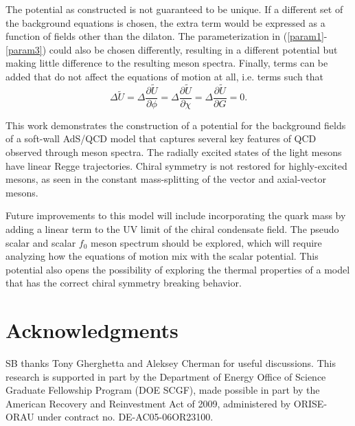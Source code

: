 \documentclass[12pt]{article}
\newcommand{\be}{\begin{equation}}
\newcommand{\ee}{\end{equation}}
\begin{document}
The potential as constructed is not guaranteed to be unique.
If a different set of the background equations is chosen, the extra term would be expressed as a function of fields other than the dilaton.
The parameterization in (\ref{param1}-\ref{param3}) could also be chosen differently, resulting in a different potential but making little difference to the resulting meson spectra.
Finally, terms can be added that do not affect the equations of motion at all, i.e. terms such that 
\be
\Delta \tilde{U} = \Delta \frac{\partial \tilde{U}}{\partial \phi} = \Delta \frac{\partial \tilde{U}}{\partial \chi} = \Delta \frac{\partial \tilde{U}}{\partial G} =0.
\ee

This work demonstrates the construction of a potential for the background fields of a soft-wall AdS/QCD model that captures several key features of QCD observed through meson spectra.
The radially excited states of the light mesons have linear Regge trajectories.
Chiral symmetry is not restored for highly-excited mesons, as seen in the constant mass-splitting of the vector and axial-vector mesons.

Future improvements to this model will include incorporating the quark mass by adding a linear term to the UV limit of the chiral condensate field.
The pseudo scalar and scalar $f_0$ meson spectrum should be explored, which will require analyzing how the equations of motion mix with the scalar potential.
This potential also opens the possibility of exploring the thermal properties of a model that has the correct chiral symmetry breaking behavior.


\section*{Acknowledgments}
SB thanks Tony Gherghetta and Aleksey Cherman for useful discussions.
This research is supported in part by the Department of Energy Office of Science Graduate Fellowship Program (DOE SCGF), made possible in part by  the American Recovery and Reinvestment Act of 2009, administered by ORISE-ORAU under contract no. DE-AC05-06OR23100.

\vfill



\end{document}

